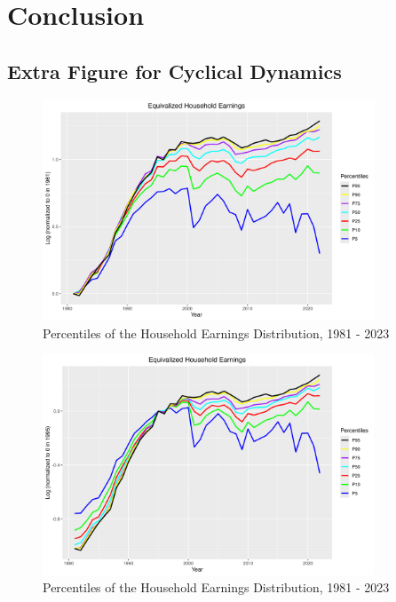 \documentclass{article}
\begin{document}
\section{Conclusion}
\label{sec:conclusion}

\newpage


\printbibliography

\newpage
\begin{appendices}
\section{Extra Figure for Cyclical Dynamics}
\label{sec:appendix_cyclical_dynamics}

\vspace{2em}

\begin{figure}[h]
    \centering
    \includegraphics[width=0.88\textwidth]{figures/Fig_2/Fig_2_percentiles_1981.png}
    \caption{Percentiles of the Household Earnings Distribution, 1981 - 2023}
    \label{fig:appendix_cyclic_earnings_1981}
\end{figure}

\vspace{4em} 

\begin{figure}[h]
    \centering
    \includegraphics[width=0.88\textwidth]{figures/Fig_2/Fig_2_percentiles_1995.png}
    \caption{Percentiles of the Household Earnings Distribution, 1981 - 2023}
    \label{fig:appendix_cyclic_earnings_1995}
\end{figure}


\end{appendices}
\end{document}
